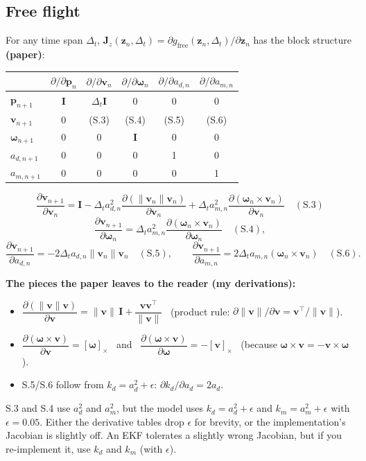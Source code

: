 \documentclass[11pt,a4paper]{article}
\newcommand{\vv}{\mathbf{v}}
\newcommand{\pp}{\mathbf{p}}
\newcommand{\zz}{\mathbf{z}}
\newcommand{\ww}{\boldsymbol{\omega}}
\begin{document}
\subsection{Free flight}
For any time span $\Delta_t$, $\mathbf J_z(\zz_n,\Delta_t)=\partial g_{\text{free}}(\zz_n,\Delta_t)/\partial\zz_n$ has the block structure \textbf{(paper)}:
\begin{center}\small
\renewcommand{\arraystretch}{1.25}
\begin{tabular}{l|ccccc}
 & $\partial/\partial\pp_n$ & $\partial/\partial\vv_n$ & $\partial/\partial\ww_n$ & $\partial/\partial a_{d,n}$ & $\partial/\partial a_{m,n}$\\ \hline
$\pp_{n+1}$ & $\mathbf I$ & $\Delta_t\mathbf I$ & 0 & 0 & 0\\
$\vv_{n+1}$ & 0 & (S.3) & (S.4) & (S.5) & (S.6)\\
$\ww_{n+1}$ & 0 & 0 & $\mathbf I$ & 0 & 0\\
$a_{d,n+1}$ & 0 & 0 & 0 & 1 & 0\\
$a_{m,n+1}$ & 0 & 0 & 0 & 0 & 1
\end{tabular}
\end{center}
\begin{eqbox}
\[
\frac{\partial\vv_{n+1}}{\partial\vv_n}=\mathbf I-\Delta_t a_{d,n}^2\frac{\partial(\|\vv_n\|\vv_n)}{\partial\vv_n}+\Delta_t a_{m,n}^2\frac{\partial(\ww_n\times\vv_n)}{\partial\vv_n}\quad(\text{S.3})
\]
\[
\frac{\partial\vv_{n+1}}{\partial\ww_n}=\Delta_t a_{m,n}^2\frac{\partial(\ww_n\times\vv_n)}{\partial\ww_n}\quad(\text{S.4}),
\]
\[
\frac{\partial\vv_{n+1}}{\partial a_{d,n}}=-2\Delta_t a_{d,n}\|\vv_n\|\vv_n\quad(\text{S.5}),\qquad
\frac{\partial\vv_{n+1}}{\partial a_{m,n}}=2\Delta_t a_{m,n}(\ww_n\times\vv_n)\quad(\text{S.6}).
\]
\end{eqbox}
\textbf{The pieces the paper leaves to the reader (my derivations):}
\begin{itemize}
\item $\dfrac{\partial(\|\vv\|\vv)}{\partial\vv}=\|\vv\|\,\mathbf I+\dfrac{\vv\vv^\top}{\|\vv\|}$ \ (product rule: $\partial\|\vv\|/\partial\vv=\vv^\top/\|\vv\|$).
\item $\dfrac{\partial(\ww\times\vv)}{\partial\vv}=[\ww]_\times$ \ and \ $\dfrac{\partial(\ww\times\vv)}{\partial\ww}=-[\vv]_\times$ \ (because $\ww\times\vv=-\vv\times\ww$).
\item S.5/S.6 follow from $k_d=a_d^2+\epsilon$: $\partial k_d/\partial a_d=2a_d$.
\end{itemize}
\begin{warn}
S.3 and S.4 use $a_d^2$ and $a_m^2$, but the model uses $k_d=a_d^2+\epsilon$ and $k_m=a_m^2+\epsilon$ with $\epsilon=0.05$. Either the derivative tables drop $\epsilon$ for brevity, or the implementation's Jacobian
is slightly off. An EKF tolerates a slightly wrong Jacobian, but if you re-implement it, use $k_d$ and $k_m$ (with $\epsilon$).
\end{warn}
\end{document}
